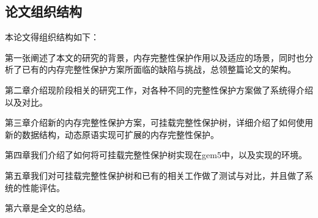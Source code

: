 \subsection{论文组织结构}
本论文得组织结构如下：

第一张阐述了本文的研究的背景，内存完整性保护作用以及适应的场景，同时也分析了已有的内存完整性保护方案所面临的缺陷与挑战，总领整篇论文的架构。

第二章介绍现阶段相关的研究工作，对各种不同的完整性保护方案做了系统得介绍以及对比。

第三章介绍新的内存完整性保护方案，可挂载完整性保护树，详细介绍了如何使用新的数据结构，动态原语实现可扩展的内存完整性保护。

第四章我们介绍了如何将可挂载完整性保护树实现在gem5中，以及实现的环境。

第五章我们对可挂载完整性保护树和已有的相关工作做了测试与对比，并且做了系统的性能评估。

第六章是全文的总结。





